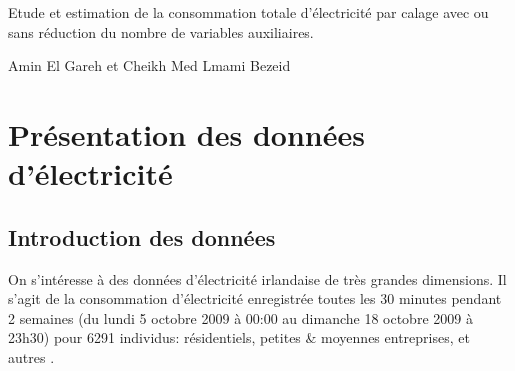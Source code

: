 \documentclass[11pt,fleqn]{book} %
\begin{document}
\let\cleardoublepage\clearpage


\begingroup
\thispagestyle{empty}

\centering
\vspace*{9cm}
\par\normalfont\fontsize{35}{35}\sffamily\selectfont
Etude et estimation de la consommation totale d'électricité par calage avec ou sans réduction du nombre de variables auxiliaires.\par %
\vspace*{1cm}
{\Huge Amin El Gareh et Cheikh Med Lmami Bezeid}\par %
\endgroup





\renewcommand\contentsname{Table des Matières}
\tableofcontents





\chapter{Présentation des données d'électricité}

\section{Introduction des données}

On s’intéresse à des données d'électricité irlandaise de très grandes dimensions. Il s'agit de la consommation d'électricité enregistrée toutes les 30 minutes pendant 2 semaines (du lundi 5 octobre 2009 à 00:00 au dimanche 18 octobre 2009 à 23h30) pour 6291 individus: résidentiels, petites \& moyennes entreprises, et autres \parencite{garnett}.


\end{document}
